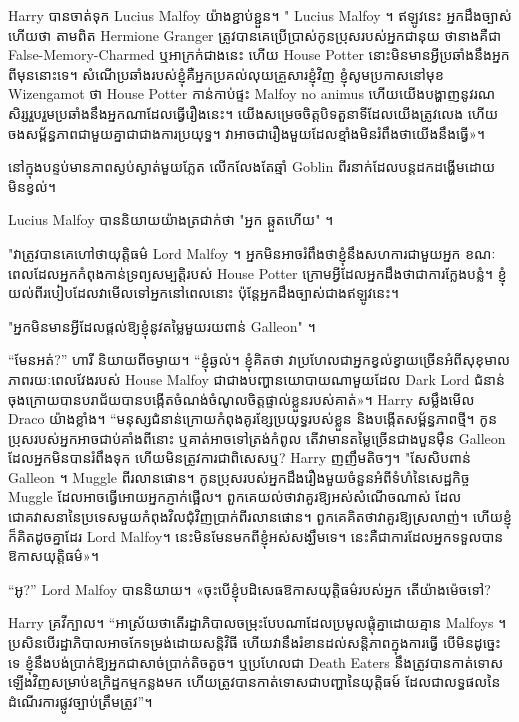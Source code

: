 {{Harry បានចាត់ទុក Lucius Malfoy យ៉ាងខ្ជាប់ខ្ជួន។ " Lucius Malfoy ។ ឥឡូវនេះ អ្នកដឹងច្បាស់ហើយថា តាមពិត Hermione Granger ត្រូវបានគេប្រើប្រាស់កូនប្រុសរបស់អ្នកជានុយ ថានាងគឺជា False-Memory-Charmed ឬអាក្រក់ជាងនេះ ហើយ House Potter នោះមិនមានអ្វីប្រឆាំងនឹងអ្នកពីមុននោះទេ។ សំណើប្រឆាំងរបស់ខ្ញុំគឺអ្នកប្រគល់លុយគ្រួសារខ្ញុំវិញ ខ្ញុំសូមប្រកាសនៅមុខ Wizengamot ថា House Potter កាន់កាប់ផ្ទះ Malfoy no animus ហើយយើងបង្ហាញនូវរណសិរ្សរួបរួមប្រឆាំងនឹងអ្នកណាដែលធ្វើរឿងនេះ។ យើង​សម្រេច​ចិត្ត​បិទ​តួនាទី​ដែល​យើង​ត្រូវ​លេង ហើយ​ចងសម្ព័ន្ធភាព​ជាមួយ​គ្នា​ជាជាង​ការ​ប្រយុទ្ធ។ វា​អាច​ជា​រឿង​មួយ​ដែល​ខ្មាំង​មិន​រំពឹង​ថា​យើង​នឹង​ធ្វើ»។

នៅក្នុងបន្ទប់មានភាពស្ងប់ស្ងាត់មួយភ្លែត លើកលែងតែឆ្មាំ Goblin ពីរនាក់ដែលបន្តដកដង្ហើមដោយមិនខ្វល់។

Lucius Malfoy បាននិយាយយ៉ាងត្រជាក់ថា "អ្នក \emph{} ឆ្កួតហើយ" ។

"វាត្រូវបានគេហៅថាយុត្តិធម៌ Lord Malfoy ។ អ្នក​មិន​អាច​រំពឹង​ថា​ខ្ញុំ​នឹង​សហការ​ជាមួយ​អ្នក ខណៈ​ពេល​ដែល​អ្នក​កំពុង​កាន់​ទ្រព្យសម្បត្តិ​របស់ House Potter ក្រោម​អ្វី​ដែល​អ្នក​ដឹង​ថា​ជា​ការ​ក្លែង​បន្លំ។ ខ្ញុំយល់ពីរបៀបដែលវាមើលទៅអ្នកនៅពេលនោះ ប៉ុន្តែអ្នកដឹងច្បាស់ជាងឥឡូវនេះ។

"អ្នកមិនមានអ្វីដែលផ្តល់ឱ្យខ្ញុំនូវតម្លៃមួយរយពាន់ Galleon" ។

“មែនអត់?” ហារី និយាយ​ពី​ចម្ងាយ។ “ខ្ញុំឆ្ងល់។ ខ្ញុំ​គិត​ថា វា​ប្រហែល​ជា​អ្នក​ខ្វល់ខ្វាយ​ច្រើន​អំពី​សុខុមាលភាព​រយៈពេល​វែង​របស់ House Malfoy ជាជាង​បញ្ហា​នយោបាយ​ណា​មួយ​ដែល​ Dark Lord ជំនាន់​ចុងក្រោយ​បាន​បរាជ័យ​បាន​បង្កើត​ចំណង់ចំណូលចិត្ត​ផ្ទាល់ខ្លួន​របស់គាត់»។ Harry សម្លឹងមើល Draco យ៉ាងខ្លាំង។ “មនុស្សជំនាន់ក្រោយកំពុងគូរខ្សែប្រយុទ្ធរបស់ខ្លួន និងបង្កើតសម្ព័ន្ធភាពថ្មី។ កូនប្រុសរបស់អ្នកអាចជាប់គាំងពីនោះ ឬគាត់អាចទៅត្រង់កំពូល តើ​វា​មាន​តម្លៃ​ច្រើន​ជាង​បួន​ម៉ឺន Galleon ដែល​អ្នក​មិន​បាន​រំពឹង​ទុក ហើយ​មិន​ត្រូវ​ការ​ជា​ពិសេស​ឬ? Harry ញញឹមតិចៗ។ "សែសិបពាន់ Galleon ។ Muggle ពីរលានផោន។ កូនប្រុសរបស់អ្នកដឹងរឿងមួយចំនួនអំពីទំហំនៃសេដ្ឋកិច្ច Muggle ដែលអាចធ្វើអោយអ្នកភ្ញាក់ផ្អើល។ ពួកគេ​យល់​ថា​វា​គួរ​ឱ្យ​អស់​សំណើច​ណាស់ ដែល​ជោគវាសនា​នៃ​ប្រទេស​មួយ​កំពុង​វិល​ជុំវិញ​ប្រាក់​ពីរ​លាន​ផោន។ ពួកគេគិតថាវាគួរឱ្យស្រលាញ់។ ហើយខ្ញុំក៏គិតដូចគ្នាដែរ Lord Malfoy។ នេះ​មិន​មែន​មក​ពី​ខ្ញុំ​អស់​សង្ឃឹម​ទេ។ នេះ​គឺ​ជា​ការ​ដែល​អ្នក​ទទួល​បាន​ឱកាស​យុត្តិធម៌​»។

“អូ?” Lord Malfoy បាននិយាយ។ «ចុះ​បើ​ខ្ញុំ​បដិសេធ​ឱកាស​យុត្តិធម៌​របស់​អ្នក តើ​យ៉ាង​ម៉េច​ទៅ?

Harry គ្រវីក្បាល។ “អាស្រ័យថាតើរដ្ឋាភិបាលចម្រុះបែបណាដែលប្រមូលផ្តុំគ្នាដោយគ្មាន Malfoys ។ ប្រសិនបើរដ្ឋាភិបាលអាចកែទម្រង់ដោយសន្តិវិធី ហើយវានឹងរំខានដល់សន្តិភាពក្នុងការធ្វើ បើមិនដូច្នេះទេ ខ្ញុំនឹងបង់ប្រាក់ឱ្យអ្នកជាសាច់ប្រាក់តិចតួច។ ឬប្រហែលជា Death Eaters នឹងត្រូវបានកាត់ទោសឡើងវិញសម្រាប់ឧក្រិដ្ឋកម្មកន្លងមក ហើយត្រូវបានកាត់ទោសជាបញ្ហានៃយុត្តិធម៍ ដែលជាលទ្ធផលនៃដំណើរការផ្លូវច្បាប់ត្រឹមត្រូវ”។

}}
